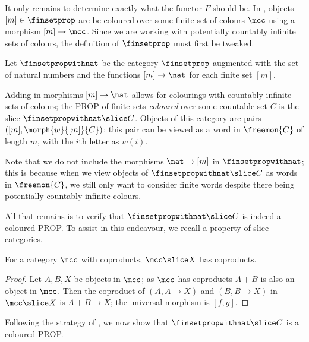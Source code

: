 It only remains to determine exactly what the functor \(F\) should be.
In \cite{bonchi2022string}, objects \([m] \in \finsetprop\) are be coloured over
some finite set of colours \(\mcc\) using a morphism \([m] \to \mcc\).
Since we are working with potentially countably infinite sets of colours, the
definition of \(\finsetprop\) must first be tweaked.

\begin{definition}
    Let \(\finsetpropwithnat\) be the category \(\finsetprop\) augmented with the
    set of natural numbers and the functions \([m] \to \nat\) for each finite
    set \([m]\).
\end{definition}

Adding in morphisms \([m] \to \nat\) allows for colourings with countably
infinite sets of colours; the PROP of finite sets \emph{coloured} over some
countable set \(C\) is the slice \(\finsetpropwithnat \slice C\).
Objects of this category are pairs \(([m], \morph{w}{[m]}{C})\); this pair can
be viewed as a word in \(\freemon{C}\) of length \(m\), with the \(i\)th letter
as \(w(i)\).

\begin{remark}
    Note that we do not include the morphisms \(\nat \to [m]\) in
    \(\finsetpropwithnat\); this is because when we view objects of
    \(\finsetpropwithnat \slice C\) as words in \(\freemon{C}\), we still only
    want to consider finite words despite there being potentially countably
    infinite colours.
\end{remark}

All that remains is to verify that \(\finsetpropwithnat \slice C\) is indeed a
coloured PROP.
To assist in this endeavour, we recall a property of slice categories.

\begin{lemma}\label{lem:slice-coproducts}
    For a category \(\mcc\) with coproducts, \(\mcc \slice X\) has coproducts.
\end{lemma}
\begin{proof}
    Let \(A,B,X\) be objects in \(\mcc\); as \(\mcc\) has coproducts \(A + B\)
    is also an object in \(\mcc\).
    Then the coproduct of \((A, A \to X)\) and \((B, B \to X)\) in
    \(\mcc \slice X\) is \(A + B \to X\); the universal morphism is \([f, g]\).
\end{proof}

Following the strategy of \cite[Prop.\ 2.23]{bonchi2022string}, we now show
that \(\finsetpropwithnat \slice C\) is a coloured PROP.

